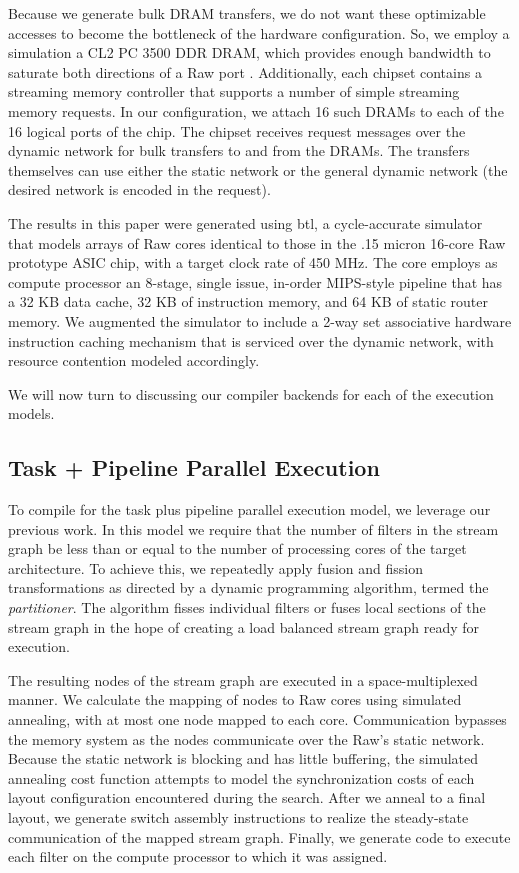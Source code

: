 Because we generate bulk DRAM transfers, we do not want these
optimizable accesses to become the bottleneck of the hardware
configuration.  So, we employ a simulation a CL2 PC 3500 DDR DRAM,
which provides enough bandwidth to saturate both directions of a Raw
port \cite{raw_isca}.  Additionally, each chipset contains a streaming
memory controller that supports a number of simple streaming memory
requests. In our configuration, we attach 16 such DRAMs to each of the
16 logical ports of the chip.  The chipset receives request messages
over the dynamic network for bulk transfers to and from the DRAMs.
The transfers themselves can use either the static network or the
general dynamic network (the desired network is encoded in the
request).

The results in this paper were generated using btl, a cycle-accurate
simulator that models arrays of Raw cores identical to those in the
.15 micron 16-core Raw prototype ASIC chip, with a target clock rate
of 450 MHz. The core employs as compute processor an 8-stage, single
issue, in-order MIPS-style pipeline that has a 32 KB data cache, 32 KB
of instruction memory, and 64 KB of static router memory.  We
augmented the simulator to include a 2-way set associative hardware
instruction caching mechanism that is serviced over the dynamic
network, with resource contention modeled accordingly. 

We will now turn to discussing our compiler backends for each of the
execution models.

\subsection{Task + Pipeline Parallel Execution}
\label{sec:space-imp}
To compile for the task plus pipeline parallel execution model, we
leverage our previous work\cite{streamit-asplos}. In this model we
require that the number of filters in the stream graph be less than or
equal to the number of processing cores of the target architecture.
To achieve this, we repeatedly apply fusion and fission
transformations as directed by a dynamic programming algorithm, termed
the {\it partitioner}.  The algorithm fisses individual filters or
fuses local sections of the stream graph in the hope of creating a
load balanced stream graph ready for execution.

The resulting nodes of the stream graph are executed in a
space-multiplexed manner.  We calculate the mapping of nodes to Raw
cores using simulated annealing, with at most one node mapped to each
core.  Communication bypasses the memory system as the nodes
communicate over the Raw's static network.  Because the static network
is blocking and has little buffering, the simulated annealing cost
function attempts to model the synchronization costs of each layout
configuration encountered during the search.  After we anneal to a
final layout, we generate switch assembly instructions to realize the
steady-state communication of the mapped stream graph.  Finally, we
generate code to execute each filter on the compute processor to which
it was assigned.

